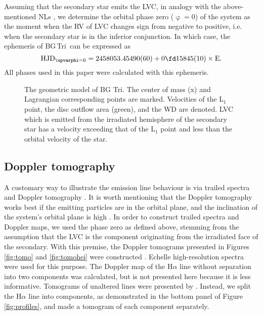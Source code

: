 \documentclass[fleqn,usenatbib]{mnras}
\def\bg{BG\,Tri}
\begin{document}
Assuming that the secondary star emits the LVC, in analogy with the above-mentioned NLs \citep{2017MNRAS.470.1960H,Subebekova20}, we determine the orbital phase zero ($\upvarphi=0$)
of the system as the moment when the RV of LVC changes sign from negative to positive, i.e. when the secondary star is in the inferior
conjunction. In which case, the ephemeris  of \bg\ can be expressed as 
\begin{equation}
 \mathrm{HJD_{\upvarphi=0}} = 245 8053.45490(60) + 0\fd15845(10)\times\mathrm{E}.
 \end{equation}
All phases used in this paper were calculated with this ephemeris. 

\begin{figure*}
\setlength{\unitlength}{1mm}
\caption{The geometric model of BG Tri.  The center of mass (x) and Lagrangian corresponding points are marked.  Velocities of the  L$_1$ point,  the disc outflow area (green), and the WD are denoted. LVC which is emitted from the irradiated hemisphere of the secondary star has a velocity exceeding that of the L$_1$ point and less than the orbital velocity of the star.}
\label{fig:Model}
\end{figure*}



\subsection{Doppler tomography}
\label{subsec:doptom}


A customary  way to illustrate the emission line behaviour is via trailed spectra and Doppler tomography \citep{1988MNRAS.235..269M}. It is
worth mentioning that the Doppler tomography works best if the emitting particles are in the orbital plane, and the inclination of the
system's orbital plane is high \citep{2005Ap&SS.296..403M}.  
In order to construct trailed spectra and Doppler maps, we used the phase zero as defined above, stemming from the assumption   
that the LVC is the component originating from the irradiated face of the secondary.
With this premise, the Doppler tomograms presented in Figures\,\ref{fig:tomo} and \ref{fig:tomohei} were constructed
\citep{1998astro.ph..6141S}. Echelle high-resolution spectra were used for this purpose. 
 The Doppler map of the H$\alpha$ line without separation into two components was calculated, but is not presented here because it is less informative. Tomograms of unaltered lines were presented by \cite{2017MNRAS.470.1960H,2018ApJ...857...80G}. Instead,  we split the  H$\alpha$ line into components, as demonstrated in  the bottom panel of Figure\,\ref{fig:profiles}, and made a tomogram of each component separately.
\end{document}
